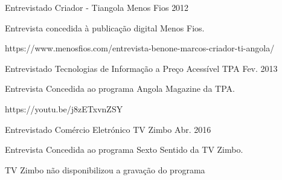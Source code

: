 


\begin{cventries}


\cventry
{Entrevistado} %
{Criador - Tiangola} %
{Menos Fios} %
{2012} %
{ %
\begin{cvitems}
\item {Entrevista concedida à publicação digital Menos Fios.}
\item {https://www.menosfios.com/entrevista-benone-marcos-criador-ti-angola/}
\end{cvitems}
}


\cventry
{Entrevistado} %
{Tecnologias de Informação a Preço Acessível} %
{TPA} %
{Fev. 2013} %
{ %
\begin{cvitems}
\item {Entrevista Concedida ao programa Angola Magazine da TPA.}
\item {https://youtu.be/j8zETxvnZSY}
\end{cvitems}
}


\cventry
{Entrevistado} %
{Comércio Eletrónico} %
{TV Zimbo} %
{Abr. 2016} %
{ %
\begin{cvitems}
\item {Entrevista Concedida ao programa Sexto Sentido da TV Zimbo.}
\item {TV Zimbo não disponibilizou a gravação do programa}
\end{cvitems}
}


\end{cventries}

